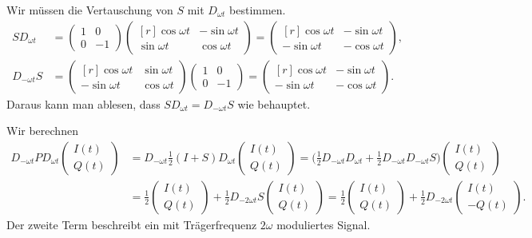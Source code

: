 \begin{loesung}
\begin{teilaufgaben}
Wir müssen die Vertauschung von $S$ mit $D_{\omega t}$ bestimmen.
\begin{align*}
SD_{\omega t}
&=
\begin{pmatrix}1&0\\0&-1\end{pmatrix}
\begin{pmatrix*}[r]
 \cos\omega t & -\sin\omega t \\
 \sin\omega t &  \cos\omega t
\end{pmatrix*}
=
\begin{pmatrix*}[r]
 \cos\omega t & -\sin\omega t \\
-\sin\omega t & -\cos\omega t
\end{pmatrix*},
\\
D_{-\omega t}S
&=
\begin{pmatrix*}[r]
  \cos\omega t &  \sin\omega t \\
 -\sin\omega t &  \cos\omega t
\end{pmatrix*}
\begin{pmatrix}1&0\\0&-1\end{pmatrix}
=
\begin{pmatrix*}[r]
  \cos\omega t & -\sin\omega t \\
 -\sin\omega t & -\cos\omega t
\end{pmatrix*}.
\end{align*}
Daraus kann man ablesen, dass
\(
SD_{\omega t}
=
D_{-\omega t}S
\)
wie behauptet.
\item
Wir berechnen 
\begin{align*}
D_{-\omega t}PD_{\omega t}\begin{pmatrix}I(t)\\Q(t)\end{pmatrix}
&=
D_{-\omega t}\frac12(I+S)D_{\omega t}\begin{pmatrix}I(t)\\Q(t)\end{pmatrix}
=
\biggl(
\frac12
D_{-\omega t}D_{\omega t}
+
\frac12
D_{-\omega t}D_{-\omega t}S
\biggr)
\begin{pmatrix}I(t)\\Q(t)\end{pmatrix}
\\
&=
\frac12
\begin{pmatrix}I(t)\\Q(t)\end{pmatrix}
+
\frac12
D_{-2\omega t}
S
\begin{pmatrix}I(t)\\Q(t)\end{pmatrix}
=
\frac12
\begin{pmatrix}I(t)\\Q(t)\end{pmatrix}
+
\frac12
D_{-2\omega t}
\begin{pmatrix}I(t)\\-Q(t)\end{pmatrix}.
\end{align*}
Der zweite Term beschreibt ein mit Trägerfrequenz $2\omega$ moduliertes Signal.
\qedhere
\end{teilaufgaben}
\end{loesung}

